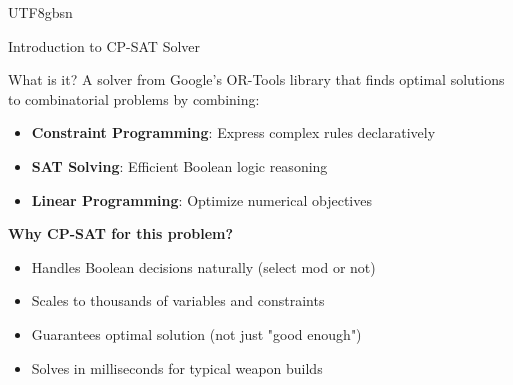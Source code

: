 \documentclass[aspectratio=169]{beamer}
\begin{document}
\begin{CJK*}{UTF8}{gbsn}
\begin{frame}{Introduction to CP-SAT Solver}
    \vspace{0.3cm}
    \begin{block}{What is it?}
        A solver from Google's OR-Tools library that finds optimal solutions to combinatorial problems by combining:
        \begin{itemize}
            \item \textbf{Constraint Programming}: Express complex rules declaratively
            \item \textbf{SAT Solving}: Efficient Boolean logic reasoning
            \item \textbf{Linear Programming}: Optimize numerical objectives
        \end{itemize}
    \end{block}

    \vspace{0.3cm}
    \textbf{Why CP-SAT for this problem?}
    \begin{itemize}
        \item Handles Boolean decisions naturally (select mod or not)
        \item Scales to thousands of variables and constraints
        \item Guarantees optimal solution (not just "good enough")
        \item Solves in milliseconds for typical weapon builds
    \end{itemize}
\end{frame}




\end{CJK*}
\end{document}
